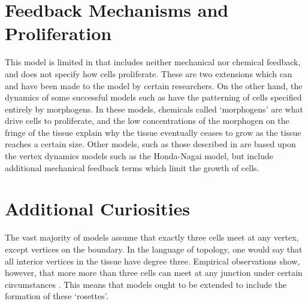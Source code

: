 \section{Feedback Mechanisms and Proliferation}
This model is limited in that includes neither mechanical nor chemical feedback, and does not specify how cells proliferate. These are two extensions which can and have been made to the model by certain researchers. On the other hand, the dynamics of some successful models such as \cite{Morphogen} have the patterning of cells specified entirely by morphogens. In these models, chemicals called `morphogens' are what drive cells to proliferate, and the low concentrations of the morphogen on the fringe of the tissue explain why the tissue eventually ceases to grow as the tissue reaches a certain size.  Other models, such as those described in \cite{MechanicalFeedback} are based upon the vertex dynamics models such as the Honda-Nagai model, but include additional mechanical feedback terms which limit the growth of cells. 

\section{Additional Curiosities}
The vast majority of models assume that exactly three cells meet at any  vertex, except vertices on the boundary. In the language of topology, one would  say that all interior vertices in the tissue have degree three. Empirical observations show, however, that more more than three cells can meet at any junction under certain circumstances \cite{Vertex Models}. This means that models ought to be extended to include the formation of these `rosettes'.
